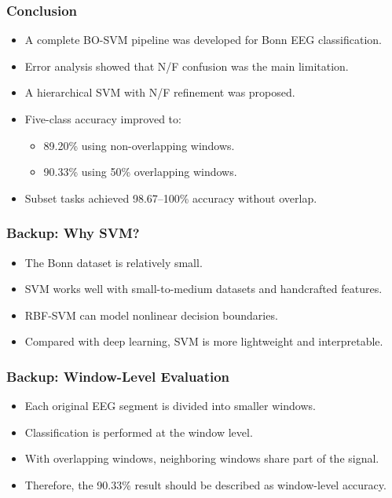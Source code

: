 \documentclass{beamer}
\begin{document}
\begin{frame}
\frametitle{Conclusion}
\begin{itemize}
\item A complete BO-SVM pipeline was developed for Bonn EEG classification.
\item Error analysis showed that N/F confusion was the main limitation.
\item A hierarchical SVM with N/F refinement was proposed.
\item Five-class accuracy improved to:
\begin{itemize}
\item 89.20\% using non-overlapping windows.
\item 90.33\% using 50\% overlapping windows.
\end{itemize}
\item Subset tasks achieved 98.67--100\% accuracy without overlap.
\end{itemize}
\end{frame}

\begin{frame}
\frametitle{Backup: Why SVM?}
\begin{itemize}
\item The Bonn dataset is relatively small.
\item SVM works well with small-to-medium datasets and handcrafted features.
\item RBF-SVM can model nonlinear decision boundaries.
\item Compared with deep learning, SVM is more lightweight and interpretable.
\end{itemize}
\end{frame}

\begin{frame}
\frametitle{Backup: Window-Level Evaluation}
\begin{itemize}
\item Each original EEG segment is divided into smaller windows.
\item Classification is performed at the window level.
\item With overlapping windows, neighboring windows share part of the signal.
\item Therefore, the 90.33\% result should be described as window-level accuracy.
\end{itemize}
\end{frame}

\begin{frame}\frametitle{}
\hspace{4cm}{\Huge Thank You}

\vspace{0.8cm}
\hspace{4.3cm}{\Large Questions?}
\end{frame}
\end{document}

